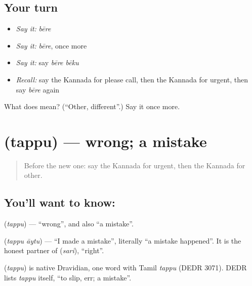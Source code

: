 \subsection*{Your turn}
\begin{itemize}
\raggedright
  \item \emph{Say it:} \emph{bēre}
  \item \emph{Say it:} \emph{bēre}, once more
  \item \emph{Say it:} say \emph{bēre bēku}
  \item \emph{Recall:} say the Kannada for please call, then the Kannada for urgent, then say \emph{bēre} again
\end{itemize}

\begin{tcolorbox}[breakable,colback=teal!4,colframe=teal!35!black,title={Before you move on}]
What does  mean? (\textquotedblleft{}Other, different\textquotedblright{}.) Say it once more.
\end{tcolorbox}
\section[\texorpdfstring{\kn{ತಪ್ಪು} (tappu)}{ತಪ್ಪು (tappu)}]{ (tappu) — wrong; a mistake}

\label{lesson:KA-C102-wrong}



\begin{quote}
Before the new one: say the Kannada for urgent, then the Kannada for other.
\end{quote}

\subsection*{You'll want to know: }
\textbf{} (\emph{tappu}) — \textquotedblleft{}wrong\textquotedblright{}, and also \textquotedblleft{}a mistake\textquotedblright{}.

\textbf{ } (\emph{tappu āytu}) — \textquotedblleft{}I made a mistake\textquotedblright{}, literally \textquotedblleft{}a mistake happened\textquotedblright{}. It is the honest partner of \textbf{} (\emph{sari}), \textquotedblleft{}right\textquotedblright{}.

\begin{cousinweb}
\textbf{} (\emph{tappu}) is native Dravidian, one word with Tamil \emph{tappu} (DEDR 3071). DEDR lists \emph{tappu} itself, \textquotedblleft{}to slip, err; a mistake\textquotedblright{}.
\end{cousinweb}

